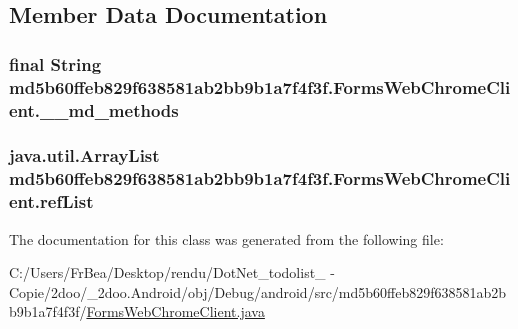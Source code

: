 \subsection{Member Data Documentation}
\hypertarget{classmd5b60ffeb829f638581ab2bb9b1a7f4f3f_1_1_forms_web_chrome_client_cdbbbfa40f7a32b9cc6eaabbd04669e5}{
\subsubsection[{\_\-\_\-md\_\-methods}]{\setlength{\rightskip}{0pt plus 5cm}final String {\bf md5b60ffeb829f638581ab2bb9b1a7f4f3f.FormsWebChromeClient.\_\-\_\-md\_\-methods}}}
\label{classmd5b60ffeb829f638581ab2bb9b1a7f4f3f_1_1_forms_web_chrome_client_cdbbbfa40f7a32b9cc6eaabbd04669e5}


\hypertarget{classmd5b60ffeb829f638581ab2bb9b1a7f4f3f_1_1_forms_web_chrome_client_070f1a439df90e372bf765d09f0fb0be}{
\subsubsection[{refList}]{\setlength{\rightskip}{0pt plus 5cm}java.util.ArrayList {\bf md5b60ffeb829f638581ab2bb9b1a7f4f3f.FormsWebChromeClient.refList}}}
\label{classmd5b60ffeb829f638581ab2bb9b1a7f4f3f_1_1_forms_web_chrome_client_070f1a439df90e372bf765d09f0fb0be}




The documentation for this class was generated from the following file:\begin{CompactItemize}
\item 
C:/Users/FrBea/Desktop/rendu/DotNet\_\-todolist\_ - Copie/2doo/\_\-2doo.Android/obj/Debug/android/src/md5b60ffeb829f638581ab2bb9b1a7f4f3f/\hyperlink{_forms_web_chrome_client_8java}{FormsWebChromeClient.java}\end{CompactItemize}
